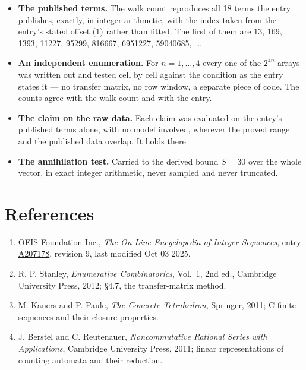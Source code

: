 \documentclass[11pt]{article}
\theoremstyle{definition}
\begin{document}
\begin{itemize}

\item {\bfseries The published terms.} The walk count reproduces all 18 terms the entry publishes, exactly, in integer arithmetic, with the index taken from the entry's stated offset (1) rather than fitted. The first of them are 13, 169, 1393, 11227, 95299, 816667, 6951227, 59040685,~\dots

\item {\bfseries An independent enumeration.} For $n = 1,\dots,4$ every one of the $2^{4n}$ arrays was written out and tested cell by cell against the condition as the entry states it --- no transfer matrix, no row window, a separate piece of code. The counts agree with the walk count and with the entry.

\item {\bfseries The claim on the raw data.} Each claim was evaluated on the entry's published terms alone, with no model involved, wherever the proved range and the published data overlap. It holds there.

\item {\bfseries The annihilation test.} Carried to the derived bound $S = 30$ over the whole vector, in exact integer arithmetic, never sampled and never truncated.

\end{itemize}

\section{References}

\begin{enumerate}

\item OEIS Foundation Inc., \emph{The On-Line Encyclopedia of Integer Sequences}, entry \href{https://oeis.org/A207178}{A207178}, revision 9, last modified Oct 03 2025.

\item R. P. Stanley, \emph{Enumerative Combinatorics}, Vol.~1, 2nd ed., Cambridge University Press, 2012; \S4.7, the transfer-matrix method.

\item M. Kauers and P. Paule, \emph{The Concrete Tetrahedron}, Springer, 2011; C-finite sequences and their closure properties.

\item J. Berstel and C. Reutenauer, \emph{Noncommutative Rational Series with Applications}, Cambridge University Press, 2011; linear representations of counting automata and their reduction.

\end{enumerate}
\end{document}
